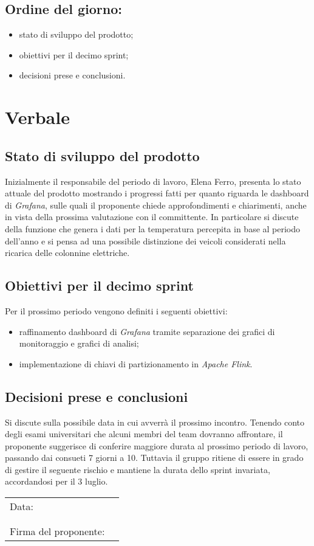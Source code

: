\documentclass[italian,12pt]{article}
\begin{document}
\subsection*{Ordine del giorno:}
\begin{itemize}
	\item stato di sviluppo del prodotto;
	\item obiettivi per il decimo sprint;
	\item decisioni prese e conclusioni.
\end{itemize}

\newpage

\section{Verbale}

\subsection{Stato di sviluppo del prodotto}
Inizialmente il responsabile del periodo di lavoro, Elena Ferro, presenta lo stato attuale del prodotto mostrando i progressi fatti
per quanto riguarda le dashboard di \textit{Grafana}, sulle quali il proponente chiede approfondimenti e chiarimenti,
anche in vista della prossima valutazione con il committente.
In particolare si discute della funzione che genera i dati per la temperatura percepita in base al periodo dell'anno e si pensa ad una possibile
distinzione dei veicoli considerati nella ricarica delle colonnine elettriche.

\subsection{Obiettivi per il decimo sprint}
Per il prossimo periodo vengono definiti i seguenti obiettivi:
\begin{itemize}
	\item raffinamento dashboard di \textit{Grafana} tramite separazione dei grafici di monitoraggio e grafici di analisi;
	\item implementazione di chiavi di partizionamento in \textit{Apache Flink}.
\end{itemize}

\subsection{Decisioni prese e conclusioni}
Si discute sulla possibile data in cui avverrà il prossimo incontro. Tenendo conto degli esami universitari che alcuni membri del team dovranno affrontare,
il proponente suggerisce di conferire maggiore durata al prossimo periodo di lavoro, passando dai consueti 7 giorni a 10. Tuttavia il gruppo
ritiene di essere in grado di gestire il seguente rischio e mantiene la durata dello sprint invariata, accordandosi per il 3 luglio.

\newpage

\begin{table}[b]
	\begin{tabular}{@{}p{5cm}p{10cm}@{}}
		Data:                 & \hrulefill \\
		                      &            \\
		                      &            \\
		Firma del proponente: & \hrulefill \\
	\end{tabular}
\end{table}
\end{document}
